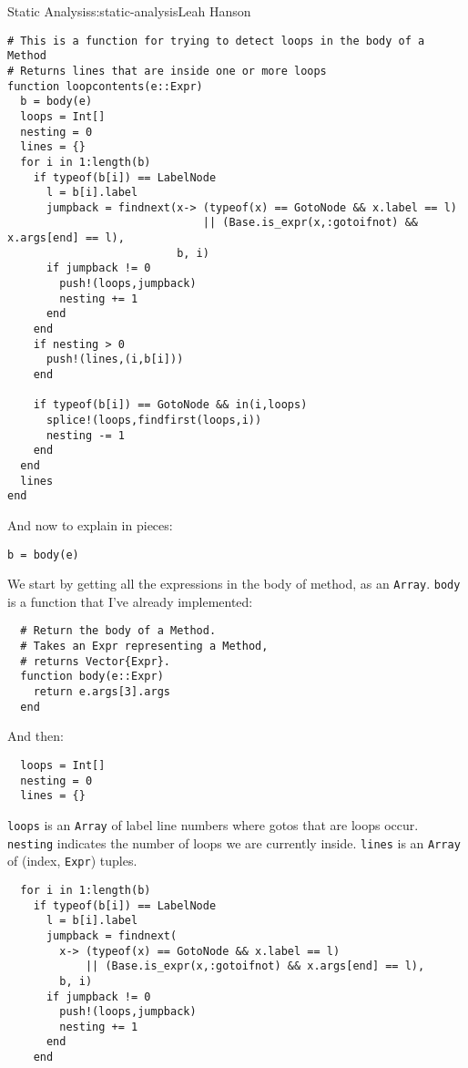 \begin{aosachapter}{Static Analysis}{s:static-analysis}{Leah Hanson}
\begin{verbatim}
# This is a function for trying to detect loops in the body of a Method
# Returns lines that are inside one or more loops
function loopcontents(e::Expr)
  b = body(e)
  loops = Int[]
  nesting = 0
  lines = {}
  for i in 1:length(b)
    if typeof(b[i]) == LabelNode
      l = b[i].label
      jumpback = findnext(x-> (typeof(x) == GotoNode && x.label == l) 
                              || (Base.is_expr(x,:gotoifnot) && x.args[end] == l),
                          b, i)
      if jumpback != 0
        push!(loops,jumpback)
        nesting += 1
      end
    end
    if nesting > 0
      push!(lines,(i,b[i]))
    end

    if typeof(b[i]) == GotoNode && in(i,loops)
      splice!(loops,findfirst(loops,i))
      nesting -= 1
    end
  end
  lines
end
\end{verbatim}

And now to explain in pieces:

\begin{verbatim}
b = body(e)
\end{verbatim}

We start by getting all the expressions in the body of method, as an
\texttt{Array}. \texttt{body} is a function that I've already
implemented:

\begin{verbatim}
  # Return the body of a Method.
  # Takes an Expr representing a Method,
  # returns Vector{Expr}.
  function body(e::Expr)
    return e.args[3].args
  end
\end{verbatim}

And then:

\begin{verbatim}
  loops = Int[]
  nesting = 0
  lines = {}
\end{verbatim}

\texttt{loops} is an \texttt{Array} of label line numbers where gotos
that are loops occur. \texttt{nesting} indicates the number of loops we
are currently inside. \texttt{lines} is an \texttt{Array} of (index,
\texttt{Expr}) tuples.

\begin{verbatim}
  for i in 1:length(b)
    if typeof(b[i]) == LabelNode
      l = b[i].label
      jumpback = findnext(
        x-> (typeof(x) == GotoNode && x.label == l) 
            || (Base.is_expr(x,:gotoifnot) && x.args[end] == l),
        b, i)
      if jumpback != 0
        push!(loops,jumpback)
        nesting += 1
      end
    end
\end{verbatim}


\end{aosachapter}
